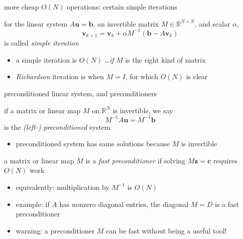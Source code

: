 \documentclass[10pt,
               svgnames,
               hyperref={colorlinks,citecolor=DeepPink4,linkcolor=FireBrick,urlcolor=Maroon},
               usepdftitle=false]{beamer}
\newcommand{\bb}{\mathbf{b}}
\newcommand{\bc}{\mathbf{c}}
\newcommand{\bu}{\mathbf{u}}
\newcommand{\bv}{\mathbf{v}}
\newcommand{\bz}{\mathbf{z}}
\newcommand{\RR}{\mathbb{R}}
\begin{document}
\begin{frame}{more cheap $O(N)$ operations: certain simple iterations}

\begin{definition} for the linear system $A\bu=\bb$, an invertible matrix $M\in \RR^{N\times N}$, and scalar $\alpha$,
    $$\bv_{k+1} = \bv_k + \alpha M^{-1} \left(\bb - A \bv_k\right)$$
is called \emph{simple iteration}
\end{definition}

\bigskip
\begin{itemize}
\item a simple iteration is $O(N)$ \dots \emph{if} $M$ is the right kind of matrix
\item \emph{Richardson} iteration is when $M=I$, for which $O(N)$ is clear
\end{itemize}
\end{frame}


\begin{frame}{preconditioned linear system, and preconditioners}

\begin{definition} if a matrix or linear map $M$ on $\RR^N$ is invertible, we say
    $$M^{-1} A \bu = M^{-1} \bb$$
is the \emph{(left-) preconditioned} system
\end{definition}

\begin{itemize}
\item preconditioned system has same solutions because $M$ is invertible
\end{itemize}

\begin{definition} a matrix or linear map $M$ is a \emph{fast preconditioner} if solving $M\bz=\bc$ requires $O(N)$ work
\end{definition}

\begin{itemize}
\item equivalently: multiplication by $M^{-1}$ is $O(N)$
\item example: if $A$ has nonzero diagonal entries, the diagonal $M=D$ is a fast preconditioner
\item warning: a preconditioner $M$ can be fast without being a useful tool!
\end{itemize}
\end{frame}
\end{document}
